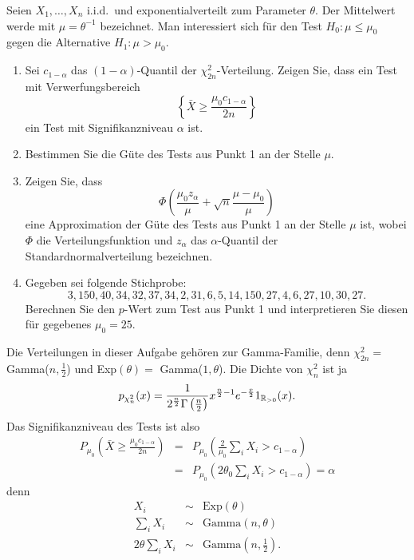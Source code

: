  Seien $X_1,\ldots,X_n$ i.i.d.\ und exponentialverteilt
zum Parameter $\theta$. Der Mittelwert werde mit $\mu=\theta^{-1}$ bezeichnet.
Man interessiert sich für den Test $H_0 : \mu \leq \mu_0$ gegen die Alternative $H_1 : \mu > \mu_0$.
\begin{enumerate}
    \item Sei $c_{1-\alpha}$ das $(1-\alpha)$-Quantil der $\chi^2_{2n}$-Verteilung. Zeigen Sie, dass
        ein Test mit Verwerfungsbereich
        \begin{equation*}
            \left\{ \bar X \geq \frac{\mu_0 c_{1-\alpha}}{2n} \right\}
        \end{equation*}
        ein Test mit Signifikanzniveau $\alpha$ ist.
    \item Bestimmen Sie die Güte des Tests aus Punkt 1 an der Stelle $\mu$.
    \item Zeigen Sie, dass 
        \begin{equation*}
            \Phi\left( \frac{\mu_0 z_\alpha}{\mu} + \sqrt{n} \frac{\mu-\mu_0}{\mu} \right) 
        \end{equation*}
        eine Approximation der Güte des Tests aus Punkt 1 an der Stelle $\mu$ ist, wobei $\Phi$ die
        Verteilungsfunktion und $z_\alpha$ das $\alpha$-Quantil der Standardnormalverteilung bezeichnen.
    \item Gegeben sei folgende Stichprobe:
        \begin{equation*}
            3,150,40,34,32,37,34,2,31,6,5,14,150,27,4,6,27,10,30,27.
        \end{equation*}
        Berechnen Sie den $p$-Wert zum Test aus Punkt 1 und interpretieren Sie diesen für gegebenes $\mu_0=25$.
\end{enumerate}

\solution Die Verteilungen in dieser Aufgabe gehören zur Gamma-Familie, denn
$\chi^2_{2n}=$ Gamma($n,\frac{1}{2}$) und Exp$(\theta) =$ Gamma($1,\theta$). Die Dichte von $\chi^2_n$ ist ja 
\begin{equation*}
    p_{\chi^2_n} (x) = 
    \frac{1}{2^{\frac{n}{2}} \Gamma\left( \frac{n}{2} \right)} x^{ \frac{n}{2} -1}e^{-\frac{x}{2}} 1_{\mathbb R_{>0}}(x).
\end{equation*}
Das Signifikanzniveau des Tests ist also
\begin{eqnarray*}
    P_{\mu_0} \left( \bar X \geq \frac{ \mu_0 c_{1-\alpha} }{2n} \right)  
    &=& P_{\mu_0} \left( \frac{2}{\mu_0} \sum_{i}^{} X_i  > c_{1-\alpha}   \right) \\
    &=& P_{\mu_0} \left( 2 \theta_0 \sum_{i}^{} X_i > c_{1-\alpha} \right) = \alpha
\end{eqnarray*}
denn 
\begin{eqnarray*}
    X_i & \sim & \textrm{Exp}(\theta) \\
    \sum_{i}^{} X_i & \sim & \textrm{Gamma}(n,\theta) \\
    2\theta \sum_{i}^{} X_i & \sim & \textrm{Gamma}(n,\frac{1}{2}).
\end{eqnarray*}

